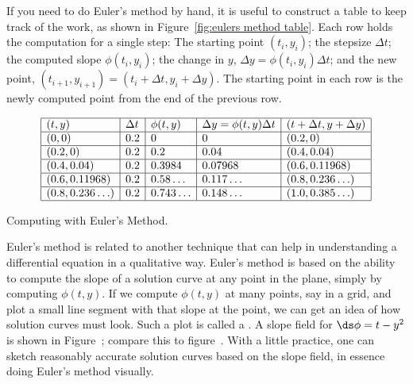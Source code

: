 \begin{solution}
If you need to do Euler's method by hand, it is useful to construct a
table to keep track of the work, as shown in Figure~\ref{fig:eulers method table}.
Each row holds the computation for a single step: The starting point
$(t_i,y_i)$; the stepsize $\Delta t$; the computed slope
$\phi(t_i,y_i)$; the change in $y$, $\Delta y=\phi(t_i,y_i)\Delta t$;
and the new point, $(t_{i+1},y_{i+1})=(t_i+\Delta t,y_i+\Delta y)$. The starting point in
each row is the newly computed point from the end of the previous row.

\figure[H]
$$\begin{array}{|l|l|l|l|l|}
\hline
 (t,y) &  \Delta t &  \phi(t,y) &  \Delta y=\phi(t,y)\Delta
  t &  (t+\Delta t,y+\Delta y) \\\hline
 (0,0) \hfill&  0.2  \hfill& 0 \hfill& 0 \hfill&  (0.2,0) \hfill\\\hline
 (0.2,0) \hfill&  0.2  \hfill&  0.2  \hfill&  0.04  \hfill&  (0.4,0.04) \hfill\\\hline
 (0.4,0.04) \hfill&  0.2  \hfill&  0.3984  \hfill&  0.07968  \hfill&  (0.6,0.11968) \hfill\\\hline
 (0.6,0.11968) \hfill&  0.2  \hfill&  0.58\ldots  \hfill&  0.117\ldots  \hfill&  (0.8,0.236\ldots) \hfill\\\hline
 (0.8,0.236\ldots) \hfill&  0.2  \hfill&  0.743\ldots  \hfill&  0.148\ldots   \hfill&  (1.0,0.385\ldots) \hfill\\
\hline
\end{array}$$
\caption{\label{fig:eulers method table}Computing with Euler's Method.}
\endfigure
\end{solution}

Euler's method is related to another technique that can help in
understanding a differential equation in a qualitative way. Euler's
method is based on the ability to compute the slope of a solution
curve at any point in the plane, simply by computing $\phi(t,y)$. If
we compute $\phi(t,y)$ at many points, say in a grid, and plot a small
line segment with that slope at the point, we can get an idea of how
solution curves must look. Such a plot is called a 
. A slope field for 
$\ds\phi=t-y^2$ is shown in Figure~; compare
this to figure~.
With a little practice, one can sketch reasonably accurate solution
curves based on the slope field, in essence doing Euler's method
visually.

